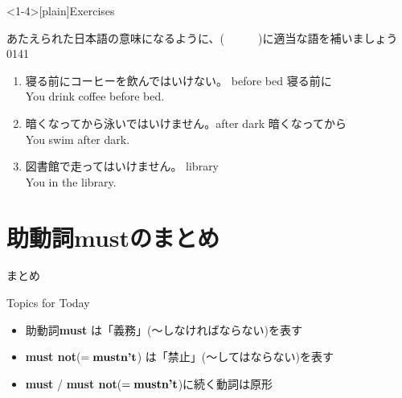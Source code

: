 \documentclass[aspectratio=169,xcolor={dvipsnames,table}]{beamer}
\newcommand{\myaudio}[1]{\href{#1}{\faVolumeUp}}
\begin{document}
\begin{frame}<1-4>[plain]{Exercises}
 
あたえられた日本語の意味になるように、(~~~~~~)に適当な語を補いましょう
\hfill{\tiny 0141}\,{\scriptsize \myaudio{./audio/013_must_05.mp3}}


\begin{enumerate}
 \item {\small 寝る前にコーヒーを飲んではいけない。}%
\hfill{}{\scriptsize before bed 寝る前に}\\
You  drink coffee before bed.
 \item {\small 暗くなってから泳いではいけません。}\hfill{}{\scriptsize after dark 暗くなってから}\\
 You  swim after dark.
 \item {\small 図書館で走ってはいけません。}%
\hfill{}{\scriptsize library }\\
 You   in the library.
\end{enumerate}
\end{frame}

\section{助動詞mustのまとめ}
\begin{frame}[plain]{まとめ}
 \Large

\begin{block}{Topics for Today}
\small
\begin{itemize}[square]
 \item<2->  助動詞{\bfseries must} は「義務」(〜しなければならない)を表す%
\hfill{}{\scriptsize {}}
 \item<3->  {\bfseries must not}($=\text{\bfseries mustn't}$) は「禁止」(〜してはならない)を表す%
\hfill{}{\scriptsize {}}
 \item<4->  {\bfseries must} / {\bfseries must not}($=\text{\bfseries mustn't}$)に続く動詞は原形
\end{itemize}
\end{block}

\vfill


\end{frame}
\end{document}
